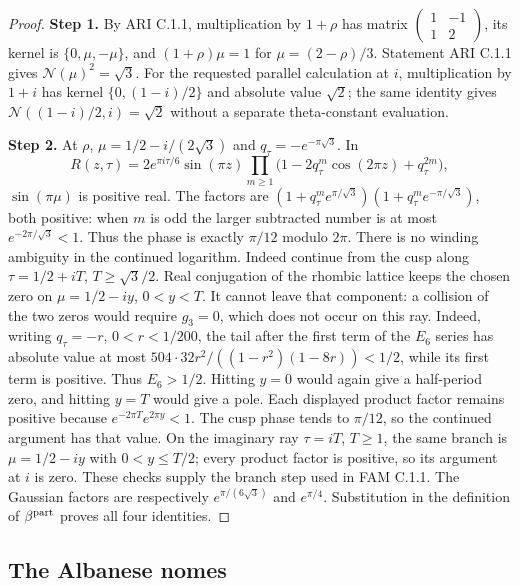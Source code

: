 \begin{proof}
\noindent\textbf{Step 1.} By ARI C.1.1, multiplication by $1+\rho$ has matrix
$\left(\begin{smallmatrix}1&-1\\1&2\end{smallmatrix}\right)$,
its kernel is $\{0,\mu,-\mu\}$, and $(1+\rho)\mu=1$ for
$\mu=(2-\rho)/3$. Statement ARI C.1.1 gives $\mathcal N(\mu)^2=\sqrt3$.
For the requested parallel calculation at $i$, multiplication by $1+i$
has kernel $\{0,(1-i)/2\}$ and absolute value $\sqrt2$; the same
identity gives $\mathcal N((1-i)/2,i)=\sqrt2$ without a separate theta-constant
evaluation.


\noindent\textbf{Step 2.} At $\rho$, $\mu=1/2-i/(2\sqrt3)$ and $q_\tau=-e^{-\pi\sqrt3}$. In
\[
 R(z,\tau)=2e^{\pi i\tau/6}\sin(\pi z)
 \prod_{m\ge1}\bigl(1-2q_\tau^m\cos(2\pi z)+q_\tau^{2m}\bigr),
\]
$\sin(\pi\mu)$ is positive real. The factors are
$(1+q_\tau^m e^{\pi/\sqrt3})(1+q_\tau^m e^{-\pi/\sqrt3})$, both positive:
when $m$ is odd the larger subtracted number is at most
$e^{-2\pi/\sqrt3}<1$. Thus the phase is exactly $\pi/12$ modulo
$2\pi$. There is no winding ambiguity in the continued logarithm.
Indeed continue from the cusp along $\tau=1/2+iT$,
$T\ge\sqrt3/2$. Real conjugation of the rhombic lattice keeps the
chosen zero on $\mu=1/2-iy$, $0<y<T$. It cannot leave that component:
a collision of the two zeros would require $g_3=0$, which does not
occur on this ray. Indeed, writing $q_\tau=-r$, $0<r<1/200$,
the tail after the first term of the $E_6$ series has absolute value
at most $504\cdot32r^2/((1-r^2)(1-8r))<1/2$, while its
first term is positive. Thus $E_6>1/2$. Hitting $y=0$ would again give a half-period zero, and
hitting $y=T$ would give a pole. Each displayed product factor remains
positive because $e^{-2\pi T}e^{2\pi y}<1$. The cusp phase tends to
$\pi/12$, so the continued argument has that value. On the imaginary
ray $\tau=iT$, $T\ge1$, the same branch is
$\mu=1/2-iy$ with $0<y\le T/2$; every product factor is positive,
so its argument at $i$ is zero. These checks supply the branch step
used in FAM C.1.1. The Gaussian factors are respectively
$e^{\pi/(6\sqrt3)}$ and $e^{\pi/4}$. Substitution in the definition of
$\beta^{\rm part}$ proves all four identities.
\end{proof}

\subsection{The Albanese nomes}

